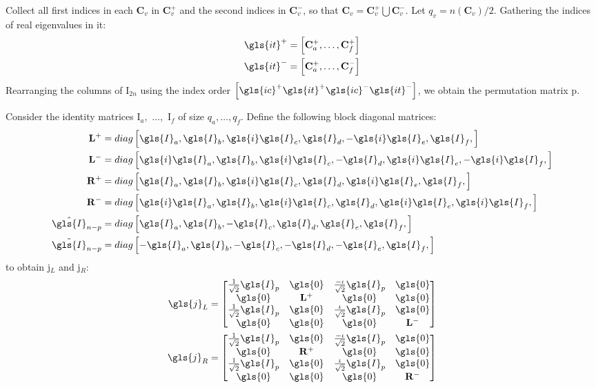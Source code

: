 Collect all first indices in each $\mathbf{C}_v$ in  $\mathbf{C}_v^+$ and the second 
indices in $\mathbf{C}_v^-$, so that $\mathbf{C}_v = \mathbf{C}_v^+\bigcup\mathbf{C}_v^-$.
Let $q_v = n(\mathbf{C}_v)/2$. Gathering the indices of real eigenvalues in \gls{it}:
\begin{align}
  	\gls{it}^+ &= \left[\mathbf{C}_a^+,\dots,\mathbf{C}_f^+\right]\\
  	\gls{it}^- &= \left[\mathbf{C}_a^+,\dots,\mathbf{C}_f^-\right]
\end{align}
Rearranging the columns of \gls{I}$_{2n}$ using the index order 
$\left[\gls{ic}^+\gls{it}^+\gls{ic}^-\gls{it}^-\right]$, we obtain the 
permutation matrix \gls{p}.

Consider the identity matrices \gls{I}$_a,$
$\dots,$ \gls{I}$_f$ of size $q_a, \dots, q_f.$ Define the following
block diagonal matrices: 
\begin{align}
	\mathbf{L}^+ &= diag\left[\gls{I}_a,\gls{I}_b,\gls{i}\gls{I}_c,
	\gls{I}_d,-\gls{i}\gls{I}_e,\gls{I}_f,\right]\\
	\mathbf{L}^- &= diag\left[\gls{i}\gls{I}_a,\gls{I}_b,\gls{i}\gls{I}_c,
	-\gls{I}_d,\gls{i}\gls{I}_e,-\gls{i}\gls{I}_f,\right]\\
	\mathbf{R}^+ &= diag\left[\gls{I}_a,\gls{I}_b,\gls{i}\gls{I}_c,
	\gls{I}_d,\gls{i}\gls{I}_e,\gls{I}_f,\right]\\
	\mathbf{R}^- &= diag\left[\gls{i}\gls{I}_a,\gls{I}_b,\gls{i}\gls{I}_c,
	\gls{I}_d,\gls{i}\gls{I}_e,\gls{i}\gls{I}_f,\right]\\
	\hat{\gls{I}}_{n-p} &= diag\left[\gls{I}_a,\gls{I}_b,-\gls{I}_c,\gls{I}_d,
	\gls{I}_e,\gls{I}_f,\right]\\ 
	\tilde{\gls{I}}_{n-p} &= diag\left[-\gls{I}_a,\gls{I}_b,-\gls{I}_c,
	-\gls{I}_d,-\gls{I}_e,\gls{I}_f,\right]
\end{align}
to obtain \gls{j}$_L$ and \gls{j}$_R$:
\begin{align}
	\gls{j}_L &= \begin{bmatrix}
		\frac{1}{\sqrt{2}}\gls{I}_p & \gls{0} & \frac{-\iota}{\sqrt{2}}\gls{I}_p & \gls{0}\\
		\gls{0} & \mathbf{L}^+ & \gls{0} & \gls{0} \\
		\frac{1}{\sqrt{2}}\gls{I}_p & \gls{0} & \frac{\iota}{\sqrt{2}}\gls{I}_p & \gls{0}\\
		\gls{0} & \gls{0} & \gls{0} & \mathbf{L}^- \\
	\end{bmatrix}\\ 
	\gls{j}_R &= \begin{bmatrix}
		\frac{1}{\sqrt{2}}\gls{I}_p & \gls{0} & \frac{-\iota}{\sqrt{2}}\gls{I}_p & \gls{0}\\
		\gls{0} & \mathbf{R}^+ & \gls{0} & \gls{0} \\
		\frac{1}{\sqrt{2}}\gls{I}_p & \gls{0} & \frac{\iota}{\sqrt{2}}\gls{I}_p & \gls{0}\\
		\gls{0} & \gls{0} & \gls{0} & \mathbf{R}^- \\
	\end{bmatrix}
\end{align}
